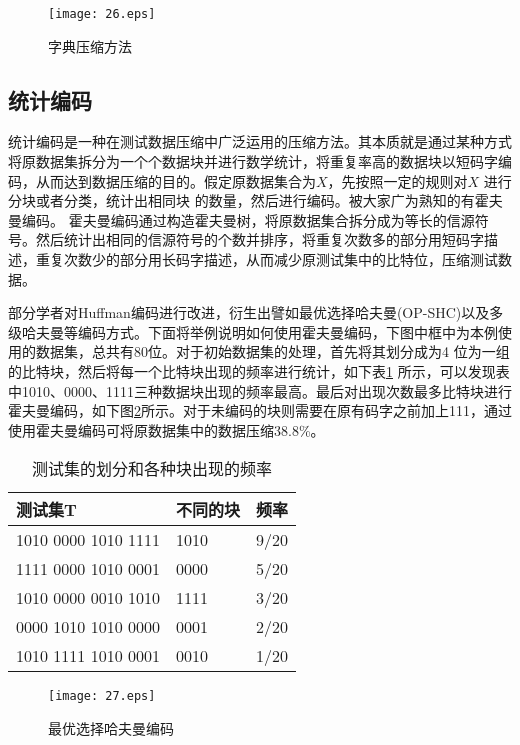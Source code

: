 \begin{figure}[H]
  \centering
  \texttt{[image: 26.eps]}
  \caption{字典压缩方法}\label{26}
     \end{figure}

\subsection{统计编码}

统计编码是一种在测试数据压缩中广泛运用的压缩方法。其本质就是通过某种方式将原数据集拆分为一个个数据块并进行数学统计，将重复率高的数据块以短码字编码，从而达到数据压缩的目的。假定原数据集合为$X$，先按照一定的规则对$X$ 进行分块或者分类，统计出相同块 的数量，然后进行编码。被大家广为熟知的有霍夫曼编码\cite{59}。 霍夫曼编码通过构造霍夫曼树，将原数据集合拆分成为等长的信源符号。然后统计出相同的信源符号的个数并排序，将重复次数多的部分用短码字描述，重复次数少的部分用长码字描述，从而减少原测试集中的比特位，压缩测试数据。

部分学者对Huffman编码进行改进，衍生出譬如最优选择哈夫曼(OP-SHC)\cite{60}以及多级哈夫曼\cite{61,62,63}等编码方式。下面将举例说明如何使用霍夫曼编码，下图中框中为本例使用的数据集，总共有80位。对于初始数据集的处理，首先将其划分成为4 位为一组的比特块，然后将每一个比特块出现的频率进行统计，如下表\ref{tabl5} 所示，可以发现表中1010、0000、1111三种数据块出现的频率最高。最后对出现次数最多比特块进行霍夫曼编码，如下图\ref{27}所示。对于未编码的块则需要在原有码字之前加上111，通过使用霍夫曼编码可将原数据集中的数据压缩38.8\%。

\begin{table}[H]
\centering
\caption{测试集的划分和各种块出现的频率}\label{tabl5}
\begin{tabular}{p{7cm}<{\centering}p{2.7cm}<{\centering}p{2.7cm}<{\centering}}
\toprule
\textbf{测试集T}&	\textbf{不同的块}&     \textbf{频率}\\
\midrule
1010 0000 1010 1111 &1010 & 9/20\\
1111 0000 1010 0001	&0000&5/20\\
1010 0000 0010 1010	&1111&3/20\\
0000 1010 1010 0000	&0001&2/20\\
1010 1111 1010 0001	&0010&1/20\\
\bottomrule
\end{tabular}
\end{table}

\begin{figure}[H]
  \centering
  \texttt{[image: 27.eps]}
  \caption{最优选择哈夫曼编码}\label{27}
     \end{figure}

